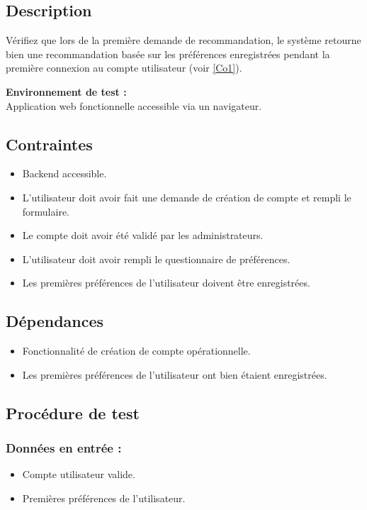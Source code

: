 \documentclass[a4paper,12pt]{report}
\begin{document}
\subsection*{Description}
Vérifiez que lors de la première demande de recommandation, le système retourne bien une recommandation basée sur les préférences enregistrées pendant la première connexion au compte utilisateur (voir \ref{Co1}).

\textbf{Environnement de test : }\\
Application web fonctionnelle accessible via un navigateur.

\subsection*{Contraintes}
\begin{itemize}
    \item Backend accessible.
    \item L’utilisateur doit avoir fait une demande de création de compte et rempli le formulaire.
    \item Le compte doit avoir été validé par les administrateurs.
    \item L’utilisateur doit avoir rempli le questionnaire de préférences.
    \item Les premières préférences de l’utilisateur doivent être enregistrées.
\end{itemize}

\subsection*{Dépendances}
\begin{itemize}
    \item Fonctionnalité de création de compte opérationnelle.
    \item Les premières préférences de l’utilisateur ont bien étaient enregistrées.
\end{itemize}

\subsection*{Procédure de test}
\subsubsection{Données en entrée :}
\begin{itemize}
    \item Compte utilisateur valide.
    \item Premières préférences de l’utilisateur.
\end{itemize}
\end{document}
